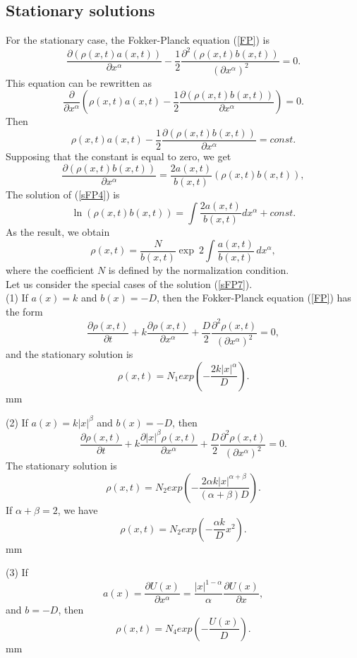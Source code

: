 \documentclass[12pt]{article}
\newcommand{\be}{\begin{equation}}
\newcommand{\ee}{\end{equation}}
\begin{document}
\subsection{Stationary solutions}

For the stationary case, the Fokker-Planck equation (\ref{FP}) is
\be \label{sFP1} 
\frac{\partial (\rho(x,t)a(x,t))}{\partial x^{\alpha}} -\frac{1}{2}
\frac{\partial^2 (\rho(x,t)b (x,t))}{(\partial x^{\alpha})^2}=0  . \ee
This equation can be rewritten as
\be \label{sFP2} 
\frac{\partial}{\partial x^{\alpha}} \left( \rho(x,t)a(x,t)-\frac{1}{2}
\frac{\partial (\rho(x,t)b (x,t))}{\partial x^{\alpha}}\right)=0  . \ee
Then 
\be \label{sFP3} 
\rho(x,t)a(x,t) -\frac{1}{2}
\frac{\partial (\rho(x,t)b (x,t))}{\partial x^{\alpha}}=const  . \ee
Supposing that the constant is equal to zero, we get
\be \label{sFP4} 
\frac{\partial (\rho(x,t)b(x,t))}{\partial x^{\alpha}}=
\frac{2a(x,t)}{b(x,t)} (\rho(x,t)b(x,t)) , \ee
The solution of (\ref{sFP4}) is
\be \label{sFP6} 
\ln (\rho(x,t)b(x,t)) = \int \frac{2a(x,t)}{b(x,t)} dx^{\alpha} +const. \ee
As the result, we obtain
\be \label{sFP7} 
\rho(x,t)= \frac{N}{b(x,t)} \exp \ 2 \int \frac{a(x,t)}{b(x,t)} \, dx^{\alpha} , \ee
where the coefficient $N$ is defined by the normalization condition. \\

Let us consider the special cases of the solution (\ref{sFP7}). \\
(1) If $a(x)=k$ and $b(x)=-D$, then 
the Fokker-Planck equation (\ref{FP}) has the form
\be \label{FP-case1} \frac{\partial \rho(x,t)}{\partial t}+
k\frac{\partial \rho(x,t)}{\partial x^{\alpha}} +\frac{D}{2}
\frac{\partial^2 \rho(x,t)}{(\partial x^{\alpha})^2}=0 , \ee
and the stationary solution is
\be \label{case1} 
\rho(x,t)= N_1 
exp \left( - \frac{2 k |x|^{\alpha}}{D} \right) . \ee
{} mm

\noindent
(2) If $a(x)=k|x|^{\beta}$ and $b(x)=-D$, then 
\be \label{FP-case2} 
\frac{\partial \rho(x,t)}{\partial t}+
k\frac{\partial  |x|^{\beta}\rho(x,t)}{\partial x^{\alpha}} +\frac{D}{2}
\frac{\partial^2 \rho(x,t)}{(\partial x^{\alpha})^2}=0  . \ee
The stationary solution is
\be \label{case2} 
\rho(x,t)= N_2 
exp \left( - \frac{2 \alpha k |x|^{\alpha+\beta}}{(\alpha+\beta)D} \right) . 
\ee
If $\alpha+\beta=2$, we have
\be \label{case2c} \rho(x,t)= 
N_2 exp \left( - \frac{\alpha k}{D} x^{2} \right) . \ee
{} mm

\noindent
(3) If 
\[ a(x)=\frac{\partial U(x)}{\partial x^{\alpha}}=\frac{|x|^{1-\alpha}}{\alpha} 
\frac{\partial U(x)}{\partial x},  \] 
and $b=-D$, then 
\[ \rho(x,t)= N_4 exp \left( - \frac{U(x)}{D} \right). \]
 mm
\end{document}

